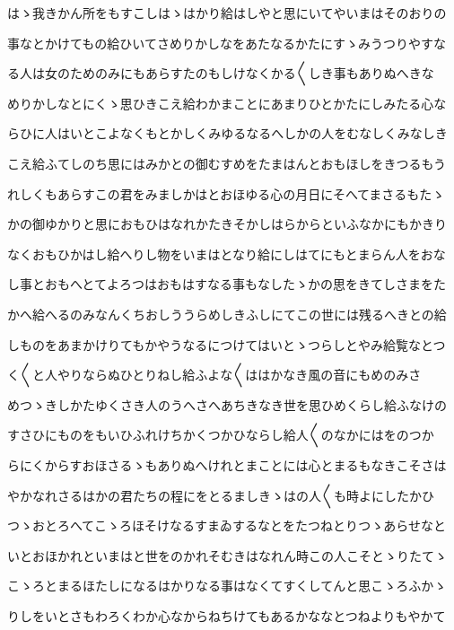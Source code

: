 \documentclass[a4paper,11pt,landscape]{ltjtarticle}
\begin{document}
\par\medskip
はゝ我きかん所をもすこしはゝはかり給はしやと思にいてやいまはそのおりの
\par\medskip
事なとかけてもの給ひいてさめりかしなをあたなるかたにすゝみうつりやすな
\par\medskip
る人は女のためのみにもあらすたのもしけなくかる〱しき事もありぬへきな
\par\medskip
めりかしなとにくゝ思ひきこえ給わかまことにあまりひとかたにしみたる心な
\par\medskip
らひに人はいとこよなくもとかしくみゆるなるへしかの人をむなしくみなしき
\par\medskip
こえ給ふてしのち思にはみかとの御むすめをたまはんとおもほしをきつるもう
\par\medskip
れしくもあらすこの君をみましかはとおほゆる心の月日にそへてまさるもたゝ
\par\medskip
かの御ゆかりと思におもひはなれかたきそかしはらからといふなかにもかきり
\par\medskip
なくおもひかはし給へりし物をいまはとなり給にしはてにもとまらん人をおな
\par\medskip
し事とおもへとてよろつはおもはすなる事もなしたゝかの思をきてしさまをた
\par\medskip
かへ給へるのみなんくちおしううらめしきふしにてこの世には残るへきとの給
\par\medskip
しものをあまかけりてもかやうなるにつけてはいとゝつらしとやみ給覧なとつ
\par\medskip
く〱と人やりならぬひとりねし給ふよな〱ははかなき風の音にもめのみさ
\par\medskip
めつゝきしかたゆくさき人のうへさへあちきなき世を思ひめくらし給ふなけの
\par\medskip
すさひにものをもいひふれけちかくつかひならし給人〱のなかにはをのつか
\par\medskip
らにくからすおほさるゝもありぬへけれとまことには心とまるもなきこそさは
\par\medskip
やかなれさるはかの君たちの程にをとるましきゝはの人〱も時よにしたかひ
\par\medskip
つゝおとろへてこゝろほそけなるすまゐするなとをたつねとりつゝあらせなと
\par\medskip
いとおほかれといまはと世をのかれそむきはなれん時この人こそとゝりたてゝ
\par\medskip
こゝろとまるほたしになるはかりなる事はなくてすくしてんと思こゝろふかゝ
\par\medskip
りしをいとさもわろくわか心なからねちけてもあるかななとつねよりもやかて
\par\medskip
\end{document}
